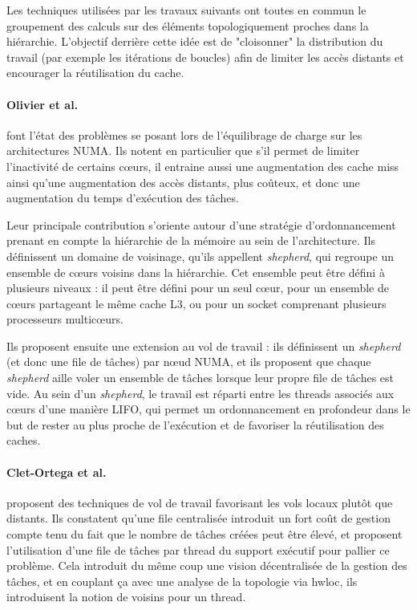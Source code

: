 Les techniques utilisées par les travaux suivants ont toutes en commun le groupement des calculs sur des éléments topologiquement proches dans la hiérarchie.
L'objectif derrière cette idée est de "cloisonner" la distribution du travail (par exemple les itérations de boucles) afin de limiter les accès distants et encourager la réutilisation du cache.

\paragraph{Olivier et al.~\cite{Olivier2012, Olivier2013}} font l'état des problèmes se posant lors de l'équilibrage de charge sur les architectures NUMA.
Ils notent en particulier que s'il permet de limiter l'inactivité de certains cœurs, il entraine aussi une augmentation des cache miss ainsi qu'une augmentation des accès distants, plus coûteux, et donc une augmentation du temps d'exécution des tâches.

Leur principale contribution s'oriente autour d'une stratégie d'ordonnancement prenant en compte la hiérarchie de la mémoire au sein de l'architecture.
Ils définissent un domaine de voisinage, qu'ils appellent \emph{shepherd}, qui regroupe un ensemble de cœurs voisins dans la hiérarchie.
Cet ensemble peut être défini à plusieurs niveaux : il peut être défini pour un seul cœur, pour un ensemble de cœurs partageant le même cache L3, ou pour un socket comprenant plusieurs processeurs multicœurs.

Ils proposent ensuite une extension au vol de travail : ils définissent un \emph{shepherd} (et donc une file de tâches) par nœud NUMA, et ils proposent que chaque \emph{shepherd} aille voler un ensemble de tâches lorsque leur propre file de tâches est vide.
Au sein d'un \emph{shepherd}, le travail est réparti entre les threads associés aux cœurs d'une manière LIFO, qui permet un ordonnancement en profondeur dans le but de rester au plus proche de l'exécution et de favoriser la réutilisation des caches.


\paragraph{Clet-Ortega et al.~\cite{Clet2014}} proposent des techniques de vol de travail favorisant les vols locaux plutôt que distants.
Ils constatent qu'une file centralisée introduit un fort coût de gestion compte tenu du fait que le nombre de tâches créées peut être élevé, et proposent l'utilisation d'une file de tâches par thread du support exécutif pour pallier ce problème.
Cela introduit du même coup une vision décentralisée de la gestion des tâches, et en couplant ça avec une analyse de la topologie via hwloc, ils introduisent la notion de voisins pour un thread.

